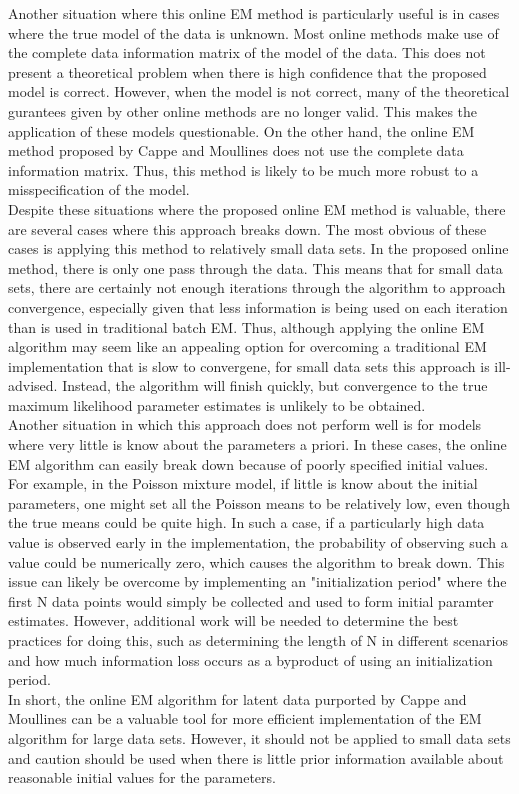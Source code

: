 \documentclass[12pt]{article}
\begin{document}
Another situation where this online EM method is particularly useful is in cases where the true model of the data is unknown. Most online methods make use of the complete data information matrix of the model of the data. This does not present a theoretical problem when there is high confidence that the proposed model is correct. However, when the model is not correct, many of the theoretical gurantees given by other online methods are no longer valid. This makes the application of these models questionable. On the other hand, the online EM method proposed by Cappe and Moullines does not use the complete data information matrix. Thus, this method is likely to be much more robust to a misspecification of the model. \\

Despite these situations where the proposed online EM method is valuable, there are several cases where this approach breaks down. The most obvious of these cases is applying this method to relatively small data sets. In the proposed online method, there is only one pass through the data. This means that for small data sets, there are certainly not enough iterations through the algorithm to approach convergence, especially given that less information is being used on each iteration than is used in traditional batch EM. Thus, although applying the online EM algorithm may seem like an appealing option for overcoming a traditional EM implementation that is slow to convergene, for small data sets this approach is ill-advised. Instead, the algorithm will finish quickly, but convergence to the true maximum likelihood parameter estimates is unlikely to be obtained.\\

Another situation in which this approach does not perform well is for models where very little is know about the parameters a priori. In these cases, the online EM algorithm can easily break down because of poorly specified initial values. For example, in the Poisson mixture model, if little is know about the initial parameters, one might set all the Poisson means to be relatively low, even though the true means could be quite high. In such a case, if a particularly high data value is observed early in the implementation, the probability of observing such a value could be numerically zero, which causes the algorithm to break down. This issue can likely be overcome by implementing an "initialization period" where the first N data points would simply be collected and used to form initial paramter estimates. However, additional work will be needed to determine the best practices for doing this, such as determining the length of N in different scenarios and how much information loss occurs as a byproduct of using an initialization period. \\

In short, the online EM algorithm for latent data purported by Cappe and Moullines can be a valuable tool for more efficient implementation of the EM algorithm for large data sets. However, it should not be applied to small data sets and caution should be used when there is little prior information available about reasonable initial values for the parameters.
\end{document}
